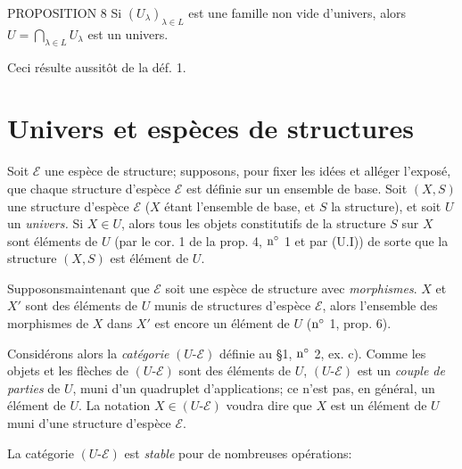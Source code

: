 \documentclass[10pt]{../fichiers-configuration-latex/smfart}
\begin{document}
\begin{enonce*}{PROPOSITION 8}
Si $(U_{\lambda})_{\lambda\in L}$ est une famille non vide
d'univers, alors $U=\bigcap_{\lambda\in L}U_{\lambda}$ est un
univers.
\end{enonce*}
Ceci résulte aussitôt de la déf. 1.

\section{Univers et espèces de structures}

Soit $\mathcal{E}$ une espèce de structure; supposons, pour fixer
les idées et alléger l'exposé, que chaque structure d'espèce
$\mathcal{E}$ est définie sur un ensemble de base. Soit $(X,S)$ une
structure d'espèce $\mathcal{E}$ ($X$ étant l'ensemble de base, et
$S$ la structure), et soit $U$ un \emph{univers.} Si $X\in U$, alors
tous les objets constitutifs de la structure $S$ sur $X$ sont
éléments de $U$ (par le cor. 1 de la prop. 4, ${\rm n^{\circ}}$ 1 et
par (U.I)) de sorte que la structure $(X,S)$ est élément de $U$.

Supposons\pageoriginale maintenant que $\mathcal{E}$ soit une espèce
de structure avec \emph{morphismes}. $X$ et $X'$ sont des éléments
de $U$ munis de structures d'espèce $\mathcal{E}$, alors l'ensemble
des morphismes de $X$ dans $X'$ est encore un élément de $U$ (${\rm
n^{\circ}}$ 1, prop. 6).

Considérons alors la \emph{catégorie} $(U\text{-}\mathcal{E})$
définie au \S 1, ${\rm n^{\circ}}$ 2, ex. c). Comme les objets et
les flèches de $(U\text{-}\mathcal{E})$ sont des éléments de $U$,
$(U\text{-}\mathcal{E})$ est un \emph{couple de parties} de $U$,
muni d'un quadruplet d'applications; ce n'est pas, en général, un
élément de $U$. La notation $X\in (U\text{-}\mathcal{E})$ voudra
dire que $X$ est un élément de $U$ muni d'une structure d'espèce
$\mathcal{E}$.

La catégorie $(U\text{-}\mathcal{E})$ est \emph{stable} pour de
nombreuses opérations:
\end{document}
